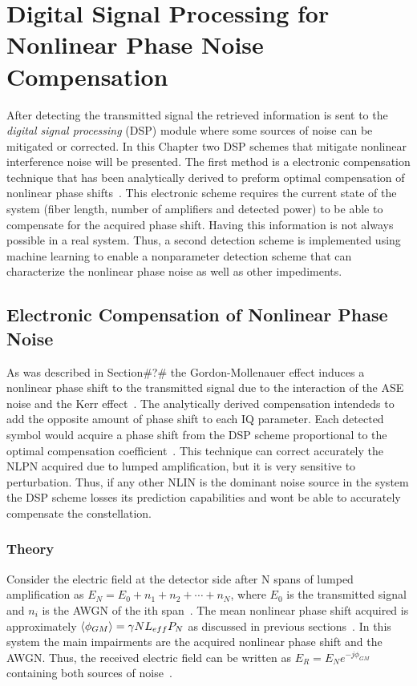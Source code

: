 



\chapter{Digital Signal Processing for Nonlinear Phase Noise Compensation}\label{ch:DSP}

After detecting the transmitted signal the retrieved information is sent to the \textit{digital signal processing} (DSP) module where some sources of noise can be mitigated or corrected. In this Chapter two DSP schemes that mitigate nonlinear interference noise will be presented. The first method is a electronic compensation technique that has been analytically derived to preform optimal compensation of nonlinear phase shifts~\cite{NLPNDSP,liu2002improving}. This electronic scheme requires the current state of the system (fiber length, number of amplifiers and detected power) to be able to compensate for the acquired phase shift. Having this information is not always possible in a real system. Thus, a second detection scheme is implemented using machine learning to enable a nonparameter detection scheme that can characterize the  nonlinear phase noise as well as other impediments. 


\section{Electronic Compensation of Nonlinear Phase Noise } \label{sec:DSPdig}
As was described in Section\#?\# the Gordon-Mollenauer effect induces a nonlinear phase shift to the transmitted signal due to the interaction of the ASE noise and the Kerr effect~\cite{gordon1990phase}. The analytically derived compensation intendeds to add the opposite amount of phase shift to each IQ parameter. Each detected symbol would acquire a phase shift from the DSP scheme proportional to the optimal compensation coefficient~\cite{liu2002improving}. This technique can correct accurately the NLPN acquired due to lumped amplification, but it is very sensitive to perturbation. Thus, if any other NLIN is the dominant noise source in the system the DSP scheme losses its prediction capabilities and wont be able to accurately compensate the constellation.~\\

\subsection{Theory}
Consider the electric field at the detector side after N spans of lumped amplification as $E_{N}=E_{0}+n_{1}+n_{2}+\cdots+n_{N}$, where $E_{0}$ is the transmitted signal and $n_{i}$ is the AWGN of the ith span~\cite{gordon1990phase}. The mean nonlinear phase shift acquired is approximately $\braket{\phi_{GM}}=\gamma N L_{eff}P_{N}$ as discussed in previous sections~\cite{NLPNDSP,FiberAgrawal}. In this system the main impairments are the acquired nonlinear phase shift and the AWGN. Thus, the received electric field can be written as  $E_{R}=E_{N}e^{-j\phi_{GM}}$ containing both sources of noise~\cite{NLPNDSP}.~\\

